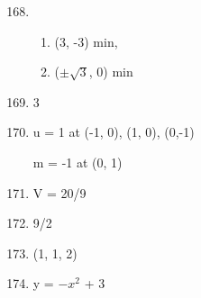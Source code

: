 \documentclass[11pt]{amsbook}
\begin{document}

\begin{enumerate}
  \setcounter{enumi}{167}
  \item 
  \begin{enumerate}
  \item (3, -3) min,  
  \item ($\pm \sqrt{3} $, 0) min 
  \end{enumerate}
  \addtocounter{enumi}{1}
  \item 3  
  \addtocounter{enumi}{1}
  \item  u = 1 at (-1, 0), (1, 0), (0,-1)\par 
m = -1 at (0, 1) 
  \addtocounter{enumi}{1}
  \item V = 20/9 
  \addtocounter{enumi}{1}
  \item 9/2  
  \addtocounter{enumi}{1}
  \item (1, 1, 2)
  \addtocounter{enumi}{1}
  \item y = $-x^{2}$ + 3 
\end{enumerate}
\end{document}
